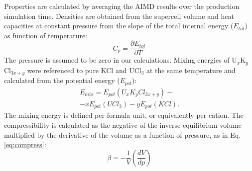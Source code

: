 \documentclass[preprint,3p,10pt,twocolumn,number,sort&compress]{elsarticle}
\begin{document}
Properties are calculated by averaging the AIMD results over the production simulation time. Densities are obtained from the supercell volume and heat capacities at constant pressure from the slope of the total internal energy ($E_{tot}$) as function of temperature:
\begin{equation}
\label{eq:cp}
C_p=\frac{\partial E_{tot}}{\partial T}
\end{equation}
The pressure is assumed to be zero in our calculations. 
Mixing energies of U$_x$K$_y$Cl$_{3x+y}$ were referenced to pure KCl and UCl$_3$ at the same temperature and calculated from the potential energy ($E_{pot}$):
\begin{equation}
\begin{split}
E_{mix}=E_{pot}(U_xK_yCl_{3x+y})-\\
-xE_{pot}(UCl_3)-yE_{pot}(KCl).
\end{split}
\end{equation}
The mixing energy is defined per formula unit, or equivalently per cation. The compressibility is calculated as the negative of the inverse equilibrium volume multiplied by the derivative of the volume as a function of pressure, as in Eq. \ref{eq:compress}: 
\begin{equation} 
\label{eq:compress}
\beta = -\frac{1}{V} {\left(\frac{dV}{dp}\right)}
\end{equation}
\end{document}

